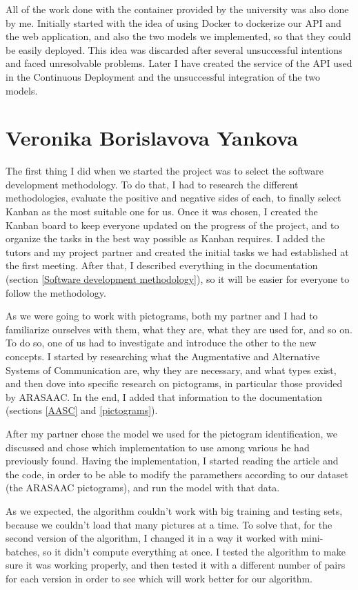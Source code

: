 All of the work done with the container provided by the university was also done by me. Initially started with the idea of using Docker to dockerize our API and the web application, and also the two models we implemented, so that they could be easily deployed. This idea was discarded after several unsuccessful intentions and faced unresolvable problems. Later I have created the service of the API used in the Continuous Deployment and the unsuccessful integration of the two models.

\section{Veronika Borislavova Yankova}

The first thing I did when we started the project was to select the software development methodology. To do that, I had to research the different methodologies, evaluate the positive and negative sides of each, to finally select Kanban as the most suitable one for us. Once it was chosen, I created the Kanban board to keep everyone updated on the progress of the project, and to organize the tasks in the best way possible as Kanban requires. I added the tutors and my project partner and created the initial tasks we had established at the first meeting. After that, I described everything in the documentation (section \ref{Software development methodology}), so it will be easier for everyone to follow the methodology.

As we were going to work with pictograms, both my partner and I had to familiarize ourselves with them, what they are, what they are used for, and so on. To do so, one of us had to investigate and introduce the other to the new concepts. I started by researching what the Augmentative and Alternative Systems of Communication are, why they are necessary, and what types exist, and then dove into specific research on pictograms, in particular those provided by ARASAAC. In the end, I added that information to the documentation (sections \ref{AASC} and \ref{pictograms}).

After my partner chose the model we used for the pictogram identification, we discussed and chose which implementation to use among various he had previously found. Having the implementation, I started  reading the article and the code, in order to be able to modify the paramethers according to our dataset (the ARASAAC pictograms), and run the model with that data.

As we expected, the algorithm couldn't work with big training and testing sets, because we couldn't load that many pictures at a time. To solve that, for the second version of the algorithm, I changed it in a way it worked with mini-batches, so it didn't compute everything at once. I tested the algorithm to make sure it was working properly, and then tested it with a different number of pairs for each version in order to see which will work better for our algorithm.

